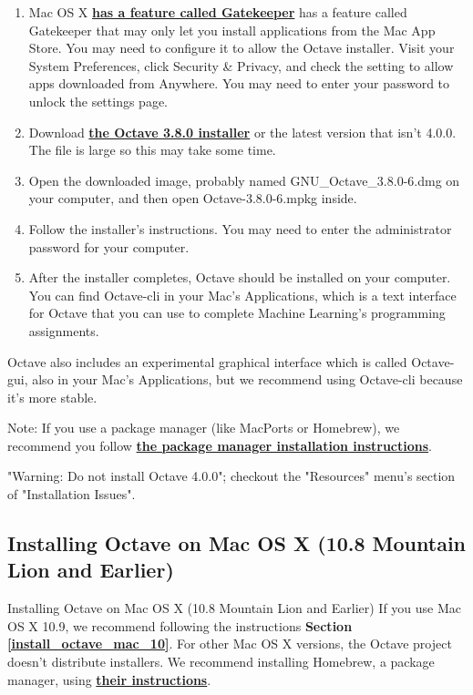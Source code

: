 \documentclass[11pt]{article}
\begin{document}
\begin{enumerate}
\def\labelenumi{\arabic{enumi}.}
\item
  Mac OS X \textbf{\href{https://support.apple.com/en-us/HT202491}{has a
  feature called Gatekeeper}} has a feature called Gatekeeper that may
  only let you install applications from the Mac App Store. You may need
  to configure it to allow the Octave installer. Visit your System
  Preferences, click Security \& Privacy, and check the setting to allow
  apps downloaded from Anywhere. You may need to enter your password to
  unlock the settings page.
\item
  Download \textbf{\href{https://wiki.octave.org/Octave_for_macOS}{the
  Octave 3.8.0 installer}} or the latest version that isn't 4.0.0. The
  file is large so this may take some time.
\item
  Open the downloaded image, probably named GNU\_Octave\_3.8.0-6.dmg on
  your computer, and then open Octave-3.8.0-6.mpkg inside.
\item
  Follow the installer's instructions. You may need to enter the
  administrator password for your computer.
\item
  After the installer completes, Octave should be installed on your
  computer. You can find Octave-cli in your Mac's Applications, which is
  a text interface for Octave that you can use to complete Machine
  Learning's programming assignments.
\end{enumerate}

Octave also includes an experimental graphical interface which is called
Octave-gui, also in your Mac's Applications, but we recommend using
Octave-cli because it's more stable.

Note: If you use a package manager (like MacPorts or Homebrew), we
recommend you follow
\textbf{\href{http://wiki.octave.org/Octave_for_macOS\#Package_Managers}{the
package manager installation instructions}}.

"Warning: Do not install Octave 4.0.0"; checkout the "Resources" menu's
section of "Installation Issues".

\subsection{Installing Octave on Mac OS X (10.8 Mountain Lion and
Earlier)}\label{installing-octave-on-mac-os-x-10.8-mountain-lion-and-earlier}

Installing Octave on Mac OS X (10.8 Mountain Lion and Earlier) If you
use Mac OS X 10.9, we recommend following the instructions
\textbf{Section \ref{install_octave_mac_10}}. For other Mac OS X
versions, the Octave project doesn't distribute installers. We recommend
installing Homebrew, a package manager, using
\textbf{\href{http://wiki.octave.org/Octave_for_macOS\#Homebrew}{their
instructions}}.
\end{document}
